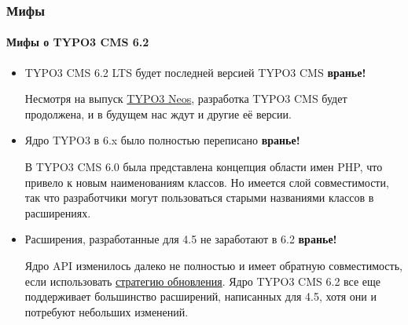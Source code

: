 \begin{frame}[fragile]
	\frametitle{Мифы}
	\framesubtitle{Мифы о TYPO3 CMS 6.2}

	\begin{itemize}
		\item TYPO3 CMS 6.2 LTS будет последней версией TYPO3 CMS
			\tabto{9cm}\color{red}\textbf{\textrightarrow вранье!}\color{black}

			\smaller
				Несмотря на выпуск \href{http://neos.typo3.org}{TYPO3 Neos}, разработка TYPO3 CMS будет продолжена,
				и в будущем нас ждут и другие её версии.
			\normalsize

		\item Ядро TYPO3 в 6.x было полностью переписано
			\tabto{9cm}\color{red}\textbf{\textrightarrow вранье!}\color{black}

			\smaller
				В TYPO3 CMS 6.0 была представлена концепция области имен PHP, что привело к новым наименованиям классов. Но
				имеется слой совместимости, так что разработчики могут пользоваться старыми названиями классов в расширениях.
			\normalsize

		\item Расширения, разработанные для 4.5 не заработают в 6.2
			\tabto{9cm}\color{red}\textbf{\textrightarrow вранье!}\color{black}

			\smaller
				Ядро API изменилось далеко не полностью и имеет обратную совместимость, если использовать \href{http://forge.typo3.org/projects/typo3v4-core/wiki/CoreDevPolicy}{стратегию обновления}. Ядро TYPO3 CMS 6.2 все еще поддерживает большинство 
				расширений, написанных для 4.5, хотя они и потребуют небольших изменений.
			\normalsize

	\end{itemize}

\end{frame}



